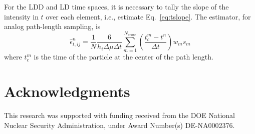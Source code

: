 \documentclass{anstrans}
\begin{document}
For the LDD and LD time spaces, it is necessary to tally the slope of the intensity in $t$ over each
element, i.e., estimate Eq.~\eqref{eq:tslope}.  The estimator, for analog path-length sampling, is
\begin{equation}
    \hat\epsilon^{n}_{t,ij} = \frac{1}{N} \frac{6}{h_i\Delta \mu\Delta t} \sum_{m=1}^{N_{score}} 
    \left(\frac{t_c^m
    - t^n}{\Delta t}\right) w_m s_m
\end{equation}
where $t_c^m$ is the time of the particle at the center of the path length.

\section{Acknowledgments}

This research was supported with funding received from the DOE National
Nuclear Security Administration, under Award Number(s) DE-NA0002376. 


\end{document}
